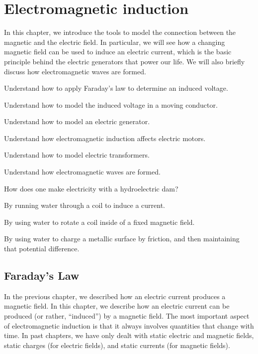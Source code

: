 \chapter{Electromagnetic induction}
\label{chapter:induction}
In this chapter, we introduce the tools to model the connection between the magnetic and the electric field. In particular, we will see how a changing magnetic field can be used to induce an electric current, which is the basic principle behind the electric generators that power our life. We will also briefly discuss how electromagnetic waves are formed.

\begin{learningObjectives}{
 \item Understand how to apply Faraday's law to determine an induced voltage.
 \item Understand how to model the induced voltage in a moving conductor.
 \item Understand how to model an electric generator.
 \item Understand how electromagnetic induction affects electric motors.
 \item Understand how to model electric transformers.
 \item Understand how electromagnetic waves are formed.
 }
\end{learningObjectives}

\begin{opening}
\begin{MCquestion}{How does one make electricity with a hydroelectric dam?}
\item By running water through a coil to induce a current.
\item By using water to rotate a coil inside of a fixed magnetic field. \correct
\item By using water to charge a metallic surface by friction, and then maintaining that potential difference.
\end{MCquestion}
\end{opening}

\section{Faraday's Law}
In the previous chapter, we described how an electric current produces a magnetic field. In this chapter, we describe how an electric current can be produced (or rather, ``induced'') by a magnetic field. The most important aspect of electromagnetic induction is that it always involves quantities that change with time. In past chapters, we have only dealt with static electric and magnetic fields, static charges (for electric fields), and static currents (for magnetic fields). 


